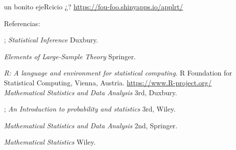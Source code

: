 \documentclass{beamer}
\begin{document}
\begin{frame}{un bonito ejeRcicio }
¿?
\url{https://fou-foo.shinyapps.io/applrt/}
\end{frame}




\begin{frame}
Referencias:$$$$

\begin{enumerate}
      
;    {\it  Statistical Inference} Duxbury. 


    {\it  Elements of Large-Sample Theory} Springer. 

 {\it R: A language and environment for statistical computing}. R Foundation for Statistical Computing, Vienna, Austria. \url{ https://www.R-project.org/}
    {\it  Mathematical Statistics and Data Analysis} 3rd, Duxbury. 

;    {\it  An Introduction to probability and statistics }3rd, Wiley.

    {\it  Mathematical Statistics and Data Analysis} 2nd, Springer. 

    {\it  Mathematical Statistics }  Wiley.

\end{enumerate}

\end{frame}
\end{document}
